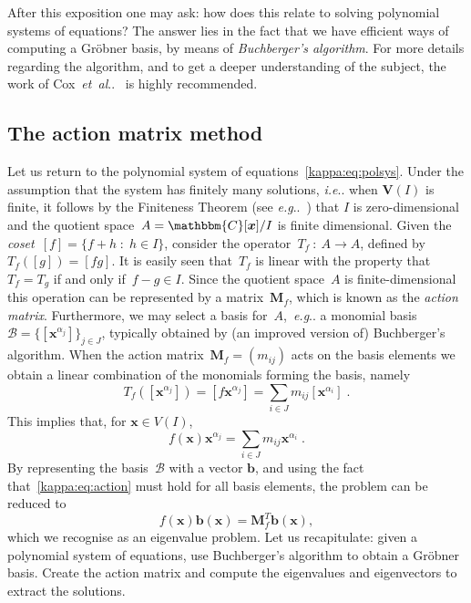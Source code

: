 \documentclass[11pt,a4paper]{article}
\makeatletter
\newcommand{\T}{T}
\newcommand{\mat}[1]{\bm{#1}}
\newcommand{\C}{\ensuremath{\mathbbm{C}}}
\DeclareRobustCommand\eg{\emph{e.g}\@ifnextchar.{}{.\@}}
\DeclareRobustCommand\etal{\emph{et~al}\@ifnextchar.{}{.\@}}
\DeclareRobustCommand\ie{\emph{i.e}\@ifnextchar.{}{.\@}}
\makeatother
\begin{document}
After this exposition one may ask: how does this relate to solving polynomial systems
of equations? The answer lies in the fact that we have efficient ways of computing
a Gröbner basis, by means of \emph{Buchberger's algorithm}.
For more details regarding the algorithm, and to get a deeper understanding of the subject,
the work of Cox~\etal{}~\cite{cox,cox2} is highly recommended.

\subsection{The action matrix method}\label{kappa:sec:actionmatrix}
Let us return to the polynomial system of equations~\eqref{kappa:eq:polsys}. Under the
assumption that the system has finitely many solutions, \ie{} when $\mat{V}(I)$ is finite,
it follows by the Finiteness Theorem (see \eg{}~\cite{cox2}) that $I$ is
zero-dimensional and the quotient space~\mbox{$A=\C[\mat{x}]/I$} is
finite dimensional. Given the \emph{coset}~$[f] = \{f+h\;:\;h\in I\}$,
consider the operator~\mbox{$T_f\::\:A\longrightarrow A$}, defined by~$T_f([g])=[fg]$.
It is easily seen that~$T_f$ is
linear with the property that~$T_f=T_g$ if and only if~$f-g\in I$.
Since the quotient space~$A$ is finite-dimensional this operation can be
represented by a matrix~$\mat{M}_f$, which is known as the \emph{action matrix}.
Furthermore, we may select a basis for~$A$,~\eg{} a monomial
basis~$\mathcal{B}=\{[\mat{x}^{\alpha_j}]\}_{j\in J}$,
typically obtained by (an improved version of)
Buchberger's algorithm.
When the action matrix~$\mat{M}_f=(m_{ij})$ acts on the basis elements we obtain a
linear combination of the monomials forming the basis, namely
\begin{equation}
    T_f([\mat{x}^{\alpha_j}]) = [f\mat{x}^{\alpha_j}]=\sum_{i\in J}m_{ij}[\mat{x}^{\alpha_i}]\;.
\end{equation}
This implies that,
for $\mat{x}\in V(I)$,
\begin{equation}\label{kappa:eq:action}
f(\mat{x})\mat{x}^{\alpha_j}=\sum_{i\in J}m_{ij}\mat{x}^{\alpha_i}\;.
\end{equation}
By representing the basis~$\mathcal{B}$ with a vector $\mat{b}$, and using the fact
that~\eqref{kappa:eq:action} must hold for all basis elements, the problem can be reduced to
\begin{equation}
f(\mat{x})\mat{b}(\mat{x}) = \mat{M}_f^{\T}\mat{b}(\mat{x}),
\end{equation}
which we recognise as an eigenvalue problem.
Let us recapitulate: given a polynomial
system of equations, use Buchberger's algorithm to obtain a Gröbner basis. Create the
action matrix and compute the eigenvalues and eigenvectors to extract the solutions.
\end{document}
